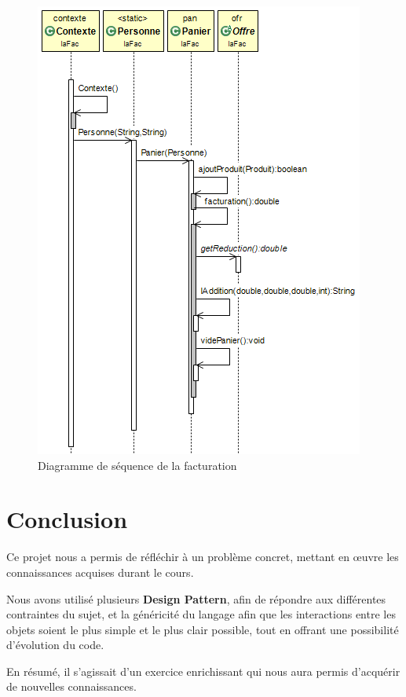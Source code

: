 \documentclass{article}
\begin{document}
\begin{figure}[ht]
	\begin{center}
		\includegraphics[scale=0.38]{ajouteProduitFactu.png}
		\caption{Diagramme de séquence de la facturation}
	\end{center}
\end{figure}


\clearpage %

\vfill
\section*{Conclusion}

Ce projet nous a permis de réfléchir à un problème concret, mettant en œuvre les connaissances acquises durant le cours.
\par
Nous avons utilisé plusieurs \textbf{Design Pattern}, afin de répondre aux différentes contraintes du sujet,
et la généricité du langage afin que les interactions entre les objets soient le plus simple et le plus clair possible, tout en offrant une possibilité d'évolution du code.
\par
En résumé, il s'agissait d'un exercice enrichissant qui nous aura permis d'acquérir de nouvelles connaissances.
\end{document}
